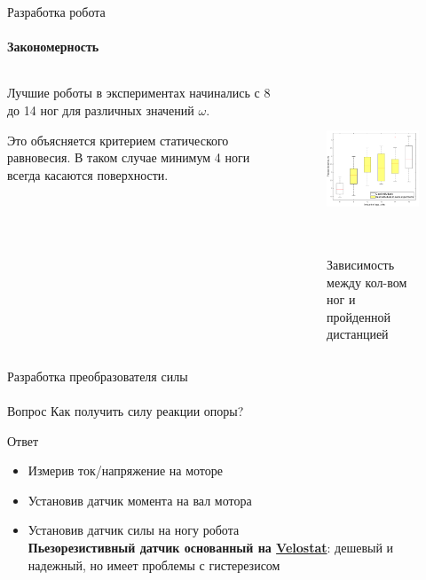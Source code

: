 \documentclass[aspectratio=169,xcolor=table]{beamer}
\begin{document}
\begin{frame}[t]{Разработка робота}
    \framesubtitle{Закономерность}
    \begin{columns}[T,onlytextwidth]
        \begin{column}{0.49\textwidth}
            Лучшие роботы в экспериментах начинались с 8 до 14 ног для различных значений $\omega$. 
            
            Это объясняется критерием статического равновесия. В таком случае минимум 4 ноги всегда касаются поверхности.    
        \end{column}
        \begin{column}{0.49\textwidth}
            \vspace{-1.8cm}
            \begin{figure}[H]
                \centering\includegraphics[height=5cm,width=1\textwidth,keepaspectratio]{box_plot_structural_synthesis.png}
                \caption*{Зависимость между кол-вом ног и пройденной дистанцией}
                \label{fig:box_plot_structural_synthesis.png}
            \end{figure}
        \end{column}
    \end{columns}
\end{frame}

\begin{frame}[t]{Разработка преобразователя силы}
    \framesubtitle{}
    {\large\begin{block}{Вопрос}
            Как получить силу реакции опоры?
        \end{block}}
    {\large\begin{alertblock}{Ответ}
        \vspace{-0.2cm}

         \begin{itemize}
            \color{lightgray}
            \item Измерив ток/напряжение на моторе
                \item Установив датчик момента на вал мотора
                \item {\color{black} Установив датчик силы на ногу робота \\  \alert{\textbf{Пьезорезистивный датчик основанный на \underline{Velostat}}: дешевый и надежный, но имеет проблемы с гистерезисом}}
            \end{itemize}
        \end{alertblock}}
\end{frame}
\end{document}
